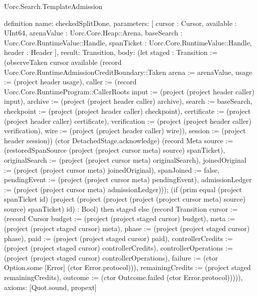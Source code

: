 \begin{lexlean}{Uorc.Search.TemplateAdmission}
\begin{semanticmodule}
definition{
  name: checkedSplitDone,
  parameters: [
    cursor : Cursor,
    available : UInt64,
    arenaValue : Uorc.Core.Heap::Arena,
    baseSearch : Uorc.Core.RuntimeValue::Handle,
    spanTicket : Uorc.Core.RuntimeValue::Handle,
    header : Header
  ],
  result: Transition,
  body: (let staged : Transition := (observeTaken cursor available (record Uorc.Core.RuntimeAdmissionCreditBoundary::Taken {arena := arenaValue, usage := (project header usage), caller := (record Uorc.Core.RuntimeProgram::CallerRoots {input := (project (project header caller) input), archive := (project (project header caller) archive), search := baseSearch, checkpoint := (project (project header caller) checkpoint), certificate := (project (project header caller) certificate), verification := (project (project header caller) verification), wire := (project (project header caller) wire)}), session := (project header session)}) (ctor DetachedStage.acknowledge) (record Meta {source := (restoredSpanSource (project (project cursor meta) source) spanTicket), originalSearch := (project (project cursor meta) originalSearch), joinedOriginal := (project (project cursor meta) joinedOriginal), spanJoined := false, pendingEvent := (project (project cursor meta) pendingEvent), admissionLedger := (project (project cursor meta) admissionLedger)})); (if (prim equal (project spanTicket id) (project (project (project (project (project cursor meta) source) source) spanTicket) id) : Bool) then staged else (record Transition {cursor := (record Cursor {budget := (project (project staged cursor) budget), meta := (project (project staged cursor) meta), phase := (project (project staged cursor) phase), paid := (project (project staged cursor) paid), controllerCredits := (project (project staged cursor) controllerCredits), controllerOperations := (project (project staged cursor) controllerOperations), failure := (ctor Option.some [Error] (ctor Error.protocol))}), remainingCredits := (project staged remainingCredits), outcome := (ctor Outcome.failed (ctor Error.protocol))}))),
  axioms: [Quot.sound, propext]
}


\end{semanticmodule}
\end{lexlean}
